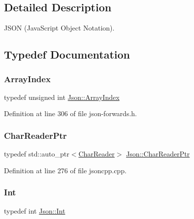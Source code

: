 \subsection{Detailed Description}
J\+S\+ON (Java\+Script Object Notation). 

\subsection{Typedef Documentation}
\hypertarget{namespace_json_a8048e741f2177c3b5d9ede4a5b8c53c2}{}\label{namespace_json_a8048e741f2177c3b5d9ede4a5b8c53c2} 
\subsubsection{\texorpdfstring{Array\+Index}{ArrayIndex}}
{\footnotesize\ttfamily typedef unsigned int \hyperlink{namespace_json_a8048e741f2177c3b5d9ede4a5b8c53c2}{Json\+::\+Array\+Index}}



Definition at line 306 of file json-\/forwards.\+h.

\hypertarget{namespace_json_a4724efb8d41614b47036cb8b54233837}{}\label{namespace_json_a4724efb8d41614b47036cb8b54233837} 
\subsubsection{\texorpdfstring{Char\+Reader\+Ptr}{CharReaderPtr}}
{\footnotesize\ttfamily typedef std\+::auto\+\_\+ptr$<$\hyperlink{class_json_1_1_char_reader}{Char\+Reader}$>$ \hyperlink{namespace_json_a4724efb8d41614b47036cb8b54233837}{Json\+::\+Char\+Reader\+Ptr}}



Definition at line 276 of file jsoncpp.\+cpp.

\hypertarget{namespace_json_a08122e8005b706d982e48cca1e2119c7}{}\label{namespace_json_a08122e8005b706d982e48cca1e2119c7} 
\subsubsection{\texorpdfstring{Int}{Int}}
{\footnotesize\ttfamily typedef int \hyperlink{namespace_json_a08122e8005b706d982e48cca1e2119c7}{Json\+::\+Int}}



